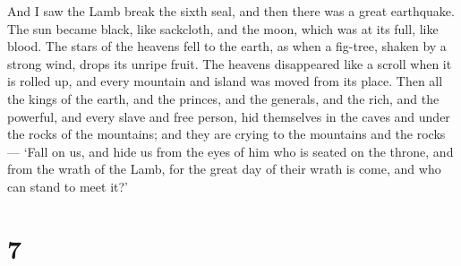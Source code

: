  And I saw the Lamb break the sixth seal, and then there
was a great earthquake. The sun became black, like sackcloth, and the
moon, which was at its full, like blood.  The stars of the
heavens fell to the earth, as when a fig-tree, shaken by a strong wind,
drops its unripe fruit.  The heavens disappeared like a
scroll when it is rolled up, and every mountain and island was moved
from its place.  Then all the kings of the earth, and the
princes, and the generals, and the rich, and the powerful, and every
slave and free person, hid themselves in the caves and under the rocks
of the mountains;  and they are crying to the mountains and
the rocks --- `Fall on us, and hide us from the eyes of him who is
seated on the throne, and from the wrath of the Lamb,  for
the great day of their wrath is come, and who can stand to meet it?'

\hypertarget{section-6}{%
\section{7}\label{section-6}}

